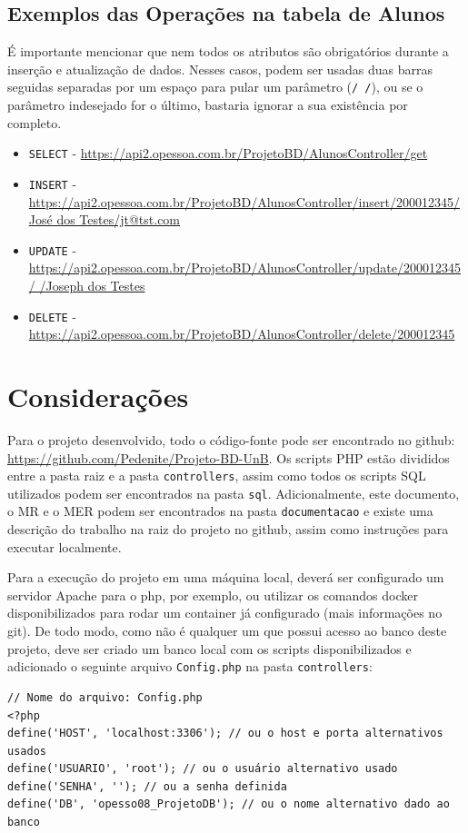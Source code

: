 \documentclass[12pt]{article}
\begin{document}
\subsection*{Exemplos das Operações na tabela de Alunos}
É importante mencionar que nem todos os atributos são obrigatórios durante a inserção e atualização de dados. Nesses casos, podem ser usadas duas barras seguidas separadas por um espaço para pular um parâmetro (\texttt{/ /}), ou se o parâmetro indesejado for o último, bastaria ignorar a sua existência por completo.

\begin{itemize}
    \label{operacoes}
    \item \texttt{SELECT} - \url{https://api2.opessoa.com.br/ProjetoBD/AlunosController/get}
    \item \texttt{INSERT} - \url{https://api2.opessoa.com.br/ProjetoBD/AlunosController/insert/200012345/José dos Testes/jt@tst.com}
    \item \texttt{UPDATE} - \url{https://api2.opessoa.com.br/ProjetoBD/AlunosController/update/200012345/ /Joseph dos Testes}
    \item \texttt{DELETE} - \url{https://api2.opessoa.com.br/ProjetoBD/AlunosController/delete/200012345}
\end{itemize}

\section*{Considerações}
Para o projeto desenvolvido, todo o código-fonte pode ser encontrado no github: \url{https://github.com/Pedenite/Projeto-BD-UnB}. Os scripts PHP estão divididos entre a pasta raiz e a pasta \texttt{controllers}, assim como todos os scripts SQL utilizados podem ser encontrados na pasta \texttt{sql}. Adicionalmente, este documento, o MR e o MER podem ser encontrados na pasta \texttt{documentacao} e existe uma descrição do trabalho na raiz do projeto no github, assim como instruções para executar localmente.

Para a execução do projeto em uma máquina local, deverá ser configurado um servidor Apache para o php, por exemplo, ou utilizar os comandos docker disponibilizados para rodar um container já configurado (mais informações no git). De todo modo, como não é qualquer um que possui acesso ao banco deste projeto, deve ser criado um banco local com os scripts disponibilizados e adicionado o seguinte arquivo \texttt{Config.php} na pasta \texttt{controllers}:

\begin{lstlisting}
// Nome do arquivo: Config.php
<?php
define('HOST', 'localhost:3306'); // ou o host e porta alternativos usados 
define('USUARIO', 'root'); // ou o usuário alternativo usado
define('SENHA', ''); // ou a senha definida
define('DB', 'opesso08_ProjetoDB'); // ou o nome alternativo dado ao banco
\end{lstlisting}
\end{document}
